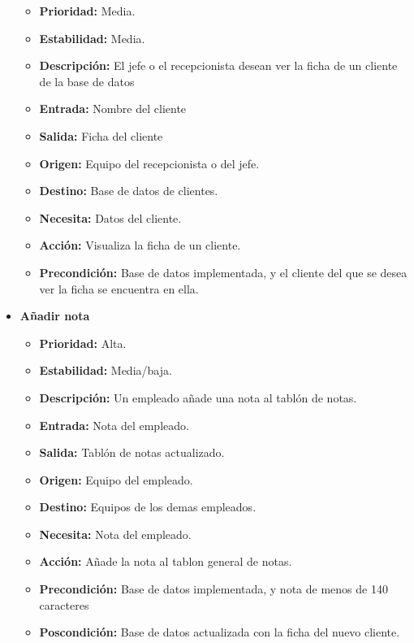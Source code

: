 \documentclass[spanish,a4paper,12pt]{report}		%
\begin{document}
\begin{itemize}
		\begin{itemize}
			\item \textbf{Prioridad: }Media.
			\item \textbf{Estabilidad: }Media.
			\item \textbf{Descripción: }El jefe o el recepcionista desean ver la ficha de un cliente de la base de datos
			\item \textbf{Entrada: } Nombre del cliente
			\item \textbf{Salida: }Ficha del cliente
			\item \textbf{Origen: }Equipo del recepcionista o del jefe.
			\item \textbf{Destino: }Base de datos de clientes. 
			\item \textbf{Necesita: }Datos del cliente. 
			\item \textbf{Acción: }Visualiza la ficha de un cliente.
			\item \textbf{Precondición: }Base de datos implementada, y el cliente del que se desea ver la ficha se encuentra en ella.
		\end{itemize}%

		\item \textbf{Añadir nota}  %

		\begin{itemize}
			\item \textbf{Prioridad: }Alta.
			\item \textbf{Estabilidad: }Media/baja.
			\item \textbf{Descripción: }Un empleado añade una nota al tablón de notas.
			\item \textbf{Entrada: } Nota del empleado.
			\item \textbf{Salida: }Tablón de notas actualizado.
			\item \textbf{Origen: }Equipo del empleado.
			\item \textbf{Destino: }Equipos de los demas empleados. 
			\item \textbf{Necesita: }Nota del empleado. 
			\item \textbf{Acción: }Añade la nota al tablon general de notas.
			\item \textbf{Precondición: }Base de datos implementada, y nota de menos de 140 caracteres
			\item \textbf{Poscondición: }Base de datos actualizada con la ficha del nuevo cliente. 



\end{itemize}
\end{itemize}
\end{document}

